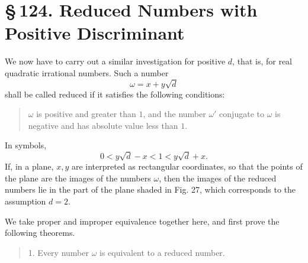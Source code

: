 \documentclass[11pt]{article}
\providecommand{\sect}[2]{\section*{\S\,#1. #2}}
\begin{document}
\sect{124}{Reduced Numbers with Positive Discriminant}

We now have to carry out a similar investigation for positive $d$, that is, for real quadratic irrational numbers. Such a number
\[
        \omega=x+y\sqrt d
\]
shall be called reduced if it satisfies the following conditions:
\begin{quote}
$\omega$ is positive and greater than $1$, and the number $\omega'$ conjugate to $\omega$ is negative and has absolute value less than $1$.
\end{quote}
In symbols,
\[
\tag{1}        0<y\sqrt d-x<1<y\sqrt d+x.
\]
If, in a plane, $x,y$ are interpreted as rectangular coordinates, so that the points of the plane are the images of the numbers $\omega$, then the images of the reduced numbers lie in the part of the plane shaded in Fig. 27, which corresponds to the assumption $d=2$.

\begin{figure}[h]
\centering
{}
\par{}
\end{figure}

We take proper and improper equivalence together here, and first prove the following theorems.

\begin{quote}
1. Every number $\omega$ is equivalent to a reduced number.
\end{quote}
\end{document}
